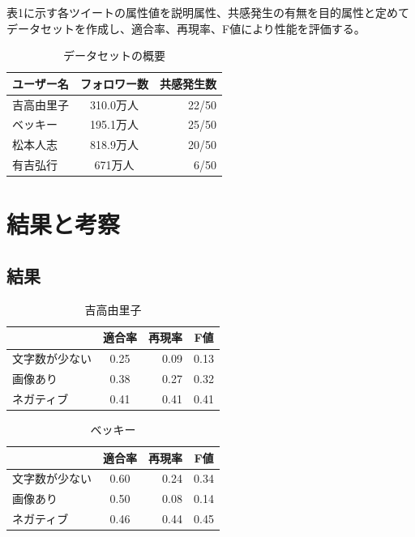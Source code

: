 \documentclass[dvipdfmx]{issj}
\begin{document}
表1に示す各ツイートの属性値を説明属性、共感発生の有無を目的属性と定めてデータセットを作成し、適合率、再現率、F値により性能を評価する。


\begin{table}[hbtp]
  \caption{データセットの概要}
  \label{table:data_type}
  \centering
  \begin{tabular}{lcr}
    \hline
   ユーザー名 & フォロワー数  &  共感発生数  \\
    \hline \hline
吉高由里子 & 310.0万人 &  22/50  \\
ベッキー & 195.1万人 &  25/50  \\
松本人志 & 818.9万人 &  20/50  \\
有吉弘行 & 671万人 &  6/50 \\
    \hline
  \end{tabular}
\end{table}


\section{結果と考察}  %


\subsection{結果}  %


\begin{table}[htb]
\centering
  \caption{吉高由里子}
  \begin{tabular}{|l||c|r|c|}  \hline
& 適合率 & 再現率 & F値 \\ \hline \hline
 文字数が少ない & 0.25 & 0.09 & 0.13 \\ \hline
  画像あり &0.38 & 0.27& 0.32\\ \hline
   ネガティブ & 0.41 & 0.41 & 0.41 \\ \hline
  \end{tabular}
\end{table}


\begin{table}[htb]
\centering
  \caption{ベッキー}
  \begin{tabular}{|l||c|r|c|}  \hline
& 適合率 & 再現率 & F値 \\ \hline \hline
 文字数が少ない & 0.60 & 0.24 & 0.34 \\ \hline
  画像あり &0.50&0.08&0.14 \\ \hline
   ネガティブ &0.46&0.44&0.45 \\ \hline
  \end{tabular}
\end{table}
\end{document}
